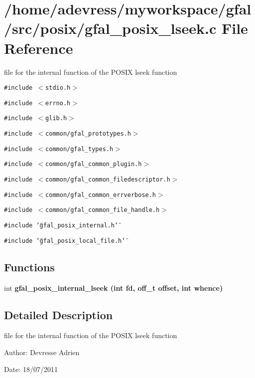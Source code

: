 \section{/home/adevress/myworkspace/gfal/src/posix/gfal\_\-posix\_\-lseek.c File Reference}
\label{gfal__posix__lseek_8c}
file for the internal function of the POSIX lseek function 

{\tt \#include $<$stdio.h$>$}\par
{\tt \#include $<$errno.h$>$}\par
{\tt \#include $<$glib.h$>$}\par
{\tt \#include $<$common/gfal\_\-prototypes.h$>$}\par
{\tt \#include $<$common/gfal\_\-types.h$>$}\par
{\tt \#include $<$common/gfal\_\-common\_\-plugin.h$>$}\par
{\tt \#include $<$common/gfal\_\-common\_\-filedescriptor.h$>$}\par
{\tt \#include $<$common/gfal\_\-common\_\-errverbose.h$>$}\par
{\tt \#include $<$common/gfal\_\-common\_\-file\_\-handle.h$>$}\par
{\tt \#include \char`\"{}gfal\_\-posix\_\-internal.h\char`\"{}}\par
{\tt \#include \char`\"{}gfal\_\-posix\_\-local\_\-file.h\char`\"{}}\par
\subsection*{Functions}
\begin{CompactItemize}
\item 
int \bf{gfal\_\-posix\_\-internal\_\-lseek} (int fd, off\_\-t offset, int whence)
\end{CompactItemize}


\subsection{Detailed Description}
file for the internal function of the POSIX lseek function 

\begin{Desc}
\item[Author:]Devresse Adrien \end{Desc}
\begin{Desc}
\item[Date:]18/07/2011 \end{Desc}



